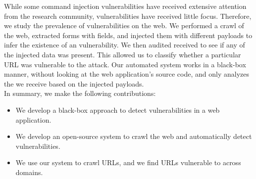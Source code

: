 While some command injection vulnerabilities have received extensive attention from the research community, \ehi vulnerabilities have received little focus. Therefore, we study the prevalence of \ehi vulnerabilities on the web. We performed a crawl of the web, extracted forms with \email fields, and injected them with different payloads to infer the existence of an \ehi vulnerability. We then audited received \emails to see if any of the injected data was present. This allowed us to classify whether a particular URL was vulnerable to the attack. Our automated system works in a black-box manner, without looking at the web application's source code, and only analyzes the \emails we receive based on the injected payloads.
\\

\noindent{}In summary, we make the following contributions:
\begin{itemize}

\item We develop a black-box approach to detect \ehi vulnerabilities in a web application.

\item We develop an open-source system to crawl the web and automatically detect \ehi vulnerabilities.

\item We use our system to crawl \urls URLs, and we find \success URLs vulnerable to \ehi across \domains domains. 

\end{itemize}

